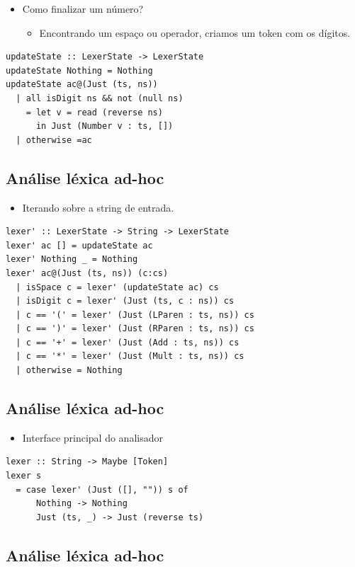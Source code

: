 \documentclass[11pt]{article}
\begin{document}
\begin{itemize}
\item Como finalizar um número?
\begin{itemize}
\item Encontrando um espaço ou operador, criamos um token
com os dígitos.
\end{itemize}
\end{itemize}

\begin{verbatim}
updateState :: LexerState -> LexerState
updateState Nothing = Nothing
updateState ac@(Just (ts, ns))
  | all isDigit ns && not (null ns)
    = let v = read (reverse ns)
      in Just (Number v : ts, [])
  | otherwise =ac
\end{verbatim}
\subsection*{Análise léxica ad-hoc}
\label{sec:orga710ae1}

\begin{itemize}
\item Iterando sobre a string de entrada.
\end{itemize}

\begin{verbatim}
lexer' :: LexerState -> String -> LexerState
lexer' ac [] = updateState ac
lexer' Nothing _ = Nothing
lexer' ac@(Just (ts, ns)) (c:cs)
  | isSpace c = lexer' (updateState ac) cs
  | isDigit c = lexer' (Just (ts, c : ns)) cs
  | c == '(' = lexer' (Just (LParen : ts, ns)) cs
  | c == ')' = lexer' (Just (RParen : ts, ns)) cs
  | c == '+' = lexer' (Just (Add : ts, ns)) cs
  | c == '*' = lexer' (Just (Mult : ts, ns)) cs
  | otherwise = Nothing
\end{verbatim}
\subsection*{Análise léxica ad-hoc}
\label{sec:orgbac4e07}

\begin{itemize}
\item Interface principal do analisador
\end{itemize}

\begin{verbatim}
lexer :: String -> Maybe [Token]
lexer s
  = case lexer' (Just ([], "")) s of
      Nothing -> Nothing
      Just (ts, _) -> Just (reverse ts)
\end{verbatim}
\subsection*{Análise léxica ad-hoc}
\label{sec:org5510db1}
\end{document}
